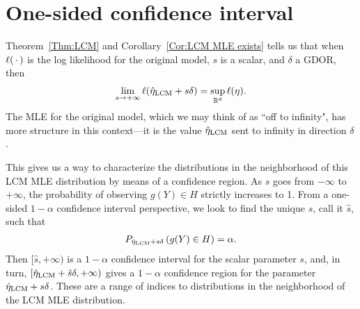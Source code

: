 \section{One-sided confidence interval} \label{S:CI}
Theorem~\ref{Thm:LCM} and Corollary~\ref{Cor:LCM MLE exists} 
tells us that when $\ell(\,\cdot\,)$ is the log likelihood for the original model,
$s$ is a scalar, and $\delta$ a GDOR, then
\begin{align*}
	\lim_{s \to +\infty} \ell(\hat{\eta}_{\textrm{LCM}} + s\delta) = \sup_{{\mathbb R}^d} \ell(\eta).
\end{align*}
The MLE for the original model, which we may think of as ``off to infinity", has
more structure in this context---it is the value $\hat{\eta}_{\textrm{LCM}}$ sent to 
infinity in direction $\delta$.

This gives us a way to characterize the distributions in the
neighborhood of this LCM MLE distribution by means of a confidence region.
As $s$ goes from $-\infty$ to $+\infty$, the probability of observing 
$g(Y) \in H$ strictly increases to 1.  
From a one-sided $1-\alpha$ confidence interval perspective, 
we look to find the unique $s$, 
call it $\hat{s}$, such that
\begin{align*}
	P_{\hat{\eta}_{\textrm{LCM}} + s\delta}\left (g(Y) \in H \right ) = \alpha.
\end{align*}
Then $[\hat{s}, +\infty)$ is a $1-\alpha$ confidence interval for the scalar parameter 
$s$, and, in turn, $[\hat{\eta}_{\textrm{LCM}} + \hat{s}\delta, +\infty)$ gives 
a $1-\alpha$ confidence region for the parameter $\hat{\eta}_{\textrm{LCM}} + s \delta$. 
These are a range of indices to distributions in the neighborhood of the LCM MLE
distribution.


